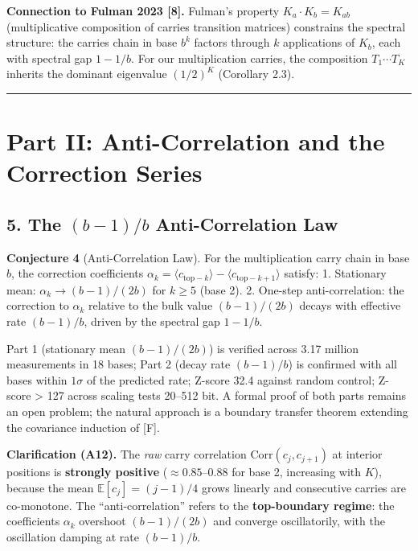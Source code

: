\documentclass[
  11pt,
]{article}
\begin{document}
\textbf{Connection to Fulman 2023 {[}8{]}.} Fulman's property
\(K_a \cdot K_b = K_{ab}\) (multiplicative composition of carries transition
matrices) constrains the spectral structure: the carries chain in base \(b^k\)
factors through \(k\) applications of \(K_b\), each with spectral gap \(1-1/b\).
For our multiplication carries, the composition \(T_1 \cdots T_K\) inherits the
dominant eigenvalue \((1/2)^K\) (Corollary 2.3).

\begin{center}\rule{0.5\linewidth}{0.5pt}\end{center}

\section{Part II: Anti-Correlation and the Correction
Series}\label{part-ii-anti-correlation-and-the-correction-series}

\newpage

\subsection{\texorpdfstring{5. The \((b-1)/b\) Anti-Correlation
Law}{5. The (b-1)/b Anti-Correlation Law}}\label{the-b-1b-anti-correlation-law}

\textbf{Conjecture 4} (Anti-Correlation Law). For the multiplication carry chain
in base \(b\), the correction coefficients
\(\alpha_k = \langle c_{\text{top}-k}\rangle - \langle c_{\text{top}-k+1}\rangle\)
satisfy: 1. Stationary mean: \(\alpha_k \to (b-1)/(2b)\) for \(k \geq 5\) (base
2). 2. One-step anti-correlation: the correction to \(\alpha_k\) relative to the
bulk value \((b-1)/(2b)\) decays with effective rate \((b-1)/b\), driven by the
spectral gap \(1 - 1/b\).

Part 1 (stationary mean \((b-1)/(2b)\)) is verified across 3.17 million
measurements in 18 bases; Part 2 (decay rate \((b-1)/b\)) is confirmed with all
bases within \(1\sigma\) of the predicted rate; Z-score 32.4 against random
control; Z-score \textgreater{} 127 across scaling tests 20--512 bit. A formal
proof of both parts remains an open problem; the natural approach is a boundary
transfer theorem extending the covariance induction of {[}F{]}.

\textbf{Clarification (A12).} The \emph{raw} carry correlation
\(\mathrm{Corr}(c_j, c_{j+1})\) at interior positions is \textbf{strongly
positive} (\(\approx 0.85\)--\(0.88\) for base 2, increasing with \(K\)),
because the mean \(\mathbb{E}[c_j] = (j-1)/4\) grows linearly and consecutive
carries are co-monotone. The ``anti-correlation'' refers to the
\textbf{top-boundary regime}: the coefficients \(\alpha_k\) overshoot
\((b-1)/(2b)\) and converge oscillatorily, with the oscillation damping at rate
\((b-1)/b\).
\end{document}
